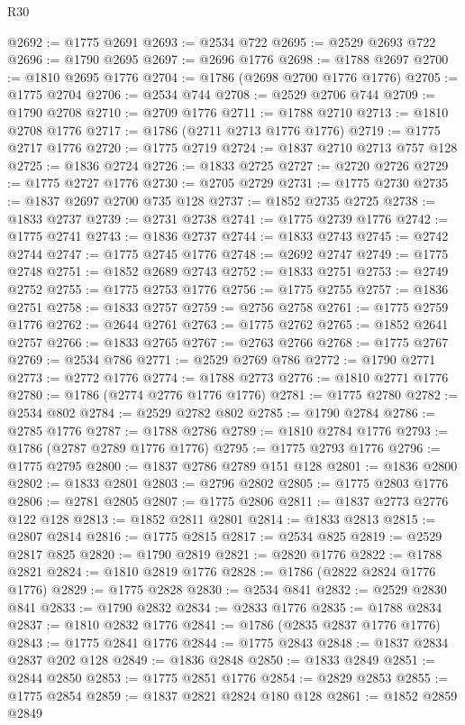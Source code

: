 \begin{lexlean}{R30}
\begin{coremodule}
{{{{{@2692 := @1775 @2691
@2693 := @2534 @722
@2695 := @2529 @2693 @722
@2696 := @1790 @2695
@2697 := @2696 @1776
@2698 := @1788 @2697
@2700 := @1810 @2695 @1776
@2704 := @1786 (@2698 @2700 @1776 @1776)
@2705 := @1775 @2704
@2706 := @2534 @744
@2708 := @2529 @2706 @744
@2709 := @1790 @2708
@2710 := @2709 @1776
@2711 := @1788 @2710
@2713 := @1810 @2708 @1776
@2717 := @1786 (@2711 @2713 @1776 @1776)
@2719 := @1775 @2717 @1776
@2720 := @1775 @2719
@2724 := @1837 @2710 @2713 @757 @128
@2725 := @1836 @2724
@2726 := @1833 @2725
@2727 := @2720 @2726
@2729 := @1775 @2727 @1776
@2730 := @2705 @2729
@2731 := @1775 @2730
@2735 := @1837 @2697 @2700 @735 @128
@2737 := @1852 @2735 @2725
@2738 := @1833 @2737
@2739 := @2731 @2738
@2741 := @1775 @2739 @1776
@2742 := @1775 @2741
@2743 := @1836 @2737
@2744 := @1833 @2743
@2745 := @2742 @2744
@2747 := @1775 @2745 @1776
@2748 := @2692 @2747
@2749 := @1775 @2748
@2751 := @1852 @2689 @2743
@2752 := @1833 @2751
@2753 := @2749 @2752
@2755 := @1775 @2753 @1776
@2756 := @1775 @2755
@2757 := @1836 @2751
@2758 := @1833 @2757
@2759 := @2756 @2758
@2761 := @1775 @2759 @1776
@2762 := @2644 @2761
@2763 := @1775 @2762
@2765 := @1852 @2641 @2757
@2766 := @1833 @2765
@2767 := @2763 @2766
@2768 := @1775 @2767
@2769 := @2534 @786
@2771 := @2529 @2769 @786
@2772 := @1790 @2771
@2773 := @2772 @1776
@2774 := @1788 @2773
@2776 := @1810 @2771 @1776
@2780 := @1786 (@2774 @2776 @1776 @1776)
@2781 := @1775 @2780
@2782 := @2534 @802
@2784 := @2529 @2782 @802
@2785 := @1790 @2784
@2786 := @2785 @1776
@2787 := @1788 @2786
@2789 := @1810 @2784 @1776
@2793 := @1786 (@2787 @2789 @1776 @1776)
@2795 := @1775 @2793 @1776
@2796 := @1775 @2795
@2800 := @1837 @2786 @2789 @151 @128
@2801 := @1836 @2800
@2802 := @1833 @2801
@2803 := @2796 @2802
@2805 := @1775 @2803 @1776
@2806 := @2781 @2805
@2807 := @1775 @2806
@2811 := @1837 @2773 @2776 @122 @128
@2813 := @1852 @2811 @2801
@2814 := @1833 @2813
@2815 := @2807 @2814
@2816 := @1775 @2815
@2817 := @2534 @825
@2819 := @2529 @2817 @825
@2820 := @1790 @2819
@2821 := @2820 @1776
@2822 := @1788 @2821
@2824 := @1810 @2819 @1776
@2828 := @1786 (@2822 @2824 @1776 @1776)
@2829 := @1775 @2828
@2830 := @2534 @841
@2832 := @2529 @2830 @841
@2833 := @1790 @2832
@2834 := @2833 @1776
@2835 := @1788 @2834
@2837 := @1810 @2832 @1776
@2841 := @1786 (@2835 @2837 @1776 @1776)
@2843 := @1775 @2841 @1776
@2844 := @1775 @2843
@2848 := @1837 @2834 @2837 @202 @128
@2849 := @1836 @2848
@2850 := @1833 @2849
@2851 := @2844 @2850
@2853 := @1775 @2851 @1776
@2854 := @2829 @2853
@2855 := @1775 @2854
@2859 := @1837 @2821 @2824 @180 @128
@2861 := @1852 @2859 @2849
}}}}}
\end{coremodule}
\end{lexlean}
